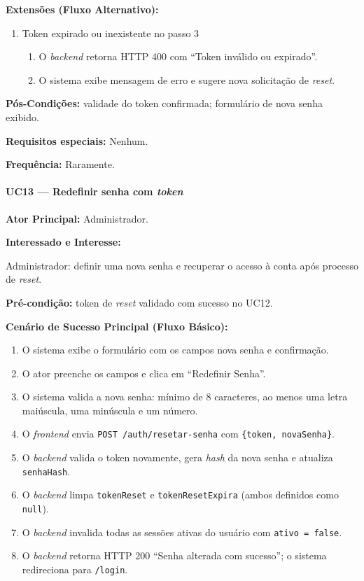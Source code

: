 \textbf{Extensões (Fluxo Alternativo):}

\begin{enumerate}
  \renewcommand{\theenumi}{3a}
  \renewcommand{\labelenumi}{\theenumi.}
  \item Token expirado ou inexistente no passo 3
  \begin{enumerate}
  \item O \textit{backend} retorna HTTP 400 com
        ``Token inválido ou expirado''.
  \item O sistema exibe mensagem de erro e sugere
        nova solicitação de \textit{reset}.
  \end{enumerate}
\end{enumerate}

\textbf{Pós-Condições:} validade do token confirmada;
formulário de nova senha exibido.

\textbf{Requisitos especiais:} Nenhum.

\textbf{Frequência:} Raramente.

\paragraph{UC13 --- Redefinir senha com \textit{token}}\hfill\break

\textbf{Ator Principal:} Administrador.

\textbf{Interessado e Interesse:}

Administrador: definir uma nova senha e recuperar o acesso
à conta após processo de \textit{reset}.

\textbf{Pré-condição:} token de \textit{reset} validado com
sucesso no UC12.

\textbf{Cenário de Sucesso Principal (Fluxo Básico):}
\begin{enumerate}
  \item O sistema exibe o formulário com os campos nova
        senha e confirmação.
  \item O ator preenche os campos e clica em
        ``Redefinir Senha''.
  \item O sistema valida a nova senha: mínimo de 8
        caracteres, ao menos uma letra maiúscula, uma
        minúscula e um número.
  \item O \textit{frontend} envia
        \texttt{POST /auth/resetar-senha} com
        \texttt{\{token, novaSenha\}}.
  \item O \textit{backend} valida o token novamente,
        gera \textit{hash} da nova senha e atualiza
        \texttt{senhaHash}.
  \item O \textit{backend} limpa \texttt{tokenReset}
        e \texttt{tokenResetExpira} (ambos definidos
        como \texttt{null}).
  \item O \textit{backend} invalida todas as sessões
        ativas do usuário com \texttt{ativo = false}.
  \item O \textit{backend} retorna HTTP 200 ``Senha
        alterada com sucesso''; o sistema redireciona
        para \texttt{/login}.
\end{enumerate}

